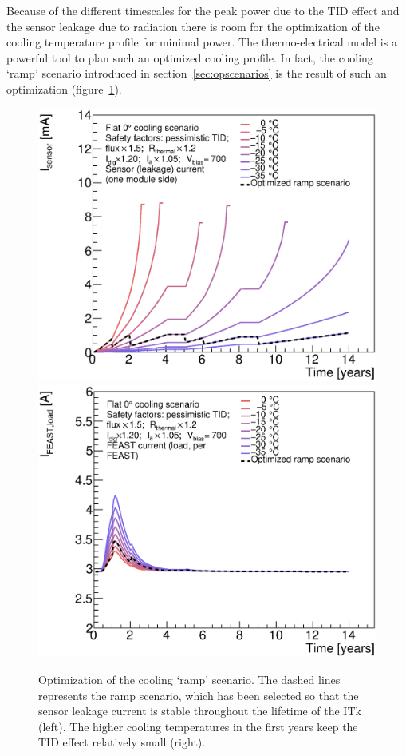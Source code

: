 Because of the different timescales for the peak power due to the TID effect and the sensor leakage due to radiation there is room for the optimization of the cooling temperature profile for minimal power. The thermo-electrical model is a powerful tool to plan such an optimized cooling profile. In fact, the cooling `ramp' scenario introduced in section~\ref{sec:opscenarios} is the result of such an optimization (figure~\ref{fig:rampoptimization}).

\begin{figure}[ht]
\centering
\includegraphics[width=0.49\linewidth]{figures/SensorCurrent_R3_newramp.eps}
\includegraphics[width=0.49\linewidth]{figures/FeastCurrent_R1_newramp.eps}
\caption{Optimization of the cooling `ramp' scenario. The dashed lines represents the ramp scenario, which has been selected so that the sensor leakage current is stable throughout the lifetime of the ITk (left). The higher cooling temperatures in the first years keep the TID effect relatively small (right).}
\label{fig:rampoptimization}
\end{figure}
